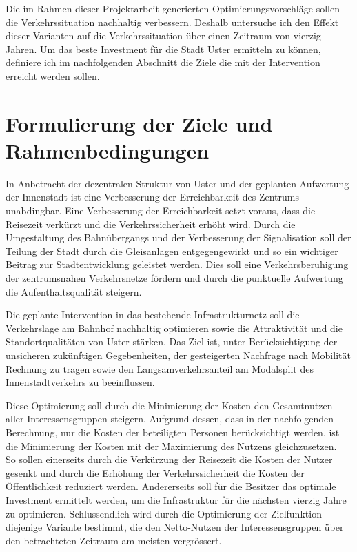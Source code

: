 Die im Rahmen dieser Projektarbeit generierten Optimierungsvorschläge sollen die Verkehrssituation nachhaltig verbessern. Deshalb untersuche ich den Effekt dieser Varianten auf die Verkehrssituation über einen Zeitraum von vierzig Jahren. Um das beste Investment für die Stadt Uster ermitteln zu können, definiere ich im nachfolgenden Abschnitt die Ziele die mit der Intervention erreicht werden sollen.

\pagebreak

\section{Formulierung der Ziele und Rahmenbedingungen}
\label{sec:Zielformulierung}

In Anbetracht der dezentralen Struktur von Uster und der geplanten Aufwertung der Innenstadt ist eine Verbesserung der Erreichbarkeit des Zentrums unabdingbar. Eine Verbesserung der Erreichbarkeit setzt voraus, dass die Reisezeit verkürzt und die Verkehrssicherheit erhöht wird. Durch die Umgestaltung des Bahnübergangs und der Verbesserung der Signalisation soll der Teilung der Stadt durch die Gleisanlagen entgegengewirkt und so ein wichtiger Beitrag zur Stadtentwicklung geleistet werden. Dies soll eine Verkehrsberuhigung der zentrumsnahen Verkehrsnetze fördern und durch die punktuelle Aufwertung die Aufenthaltsqualität steigern.

Die geplante Intervention in das bestehende Infrastrukturnetz soll die Verkehrslage am Bahnhof nachhaltig optimieren sowie die Attraktivität und die Standortqualitäten von Uster stärken. Das Ziel ist, unter Berücksichtigung der unsicheren zukünftigen Gegebenheiten, der gesteigerten Nachfrage nach Mobilität Rechnung zu tragen sowie den Langsamverkehrsanteil am Modalsplit des Innenstadtverkehrs zu beeinflussen.
 
Diese Optimierung soll durch die Minimierung der Kosten den Gesamtnutzen aller Interessensgruppen steigern. Aufgrund dessen, dass in der nachfolgenden Berechnung, nur die Kosten der beteiligten Personen berücksichtigt werden, ist die Minimierung der Kosten mit der Maximierung des Nutzens gleichzusetzen. \\
So sollen einerseits durch die Verkürzung der Reisezeit die Kosten der Nutzer gesenkt und durch die Erhöhung der Verkehrssicherheit die Kosten der Öffentlichkeit reduziert werden. Andererseits soll für die Besitzer das optimale Investment ermittelt werden, um die Infrastruktur für die nächsten vierzig Jahre zu optimieren.
Schlussendlich wird durch die Optimierung der Zielfunktion diejenige Variante bestimmt, die den Netto-Nutzen der Interessensgruppen über den betrachteten Zeitraum am meisten vergrössert.


